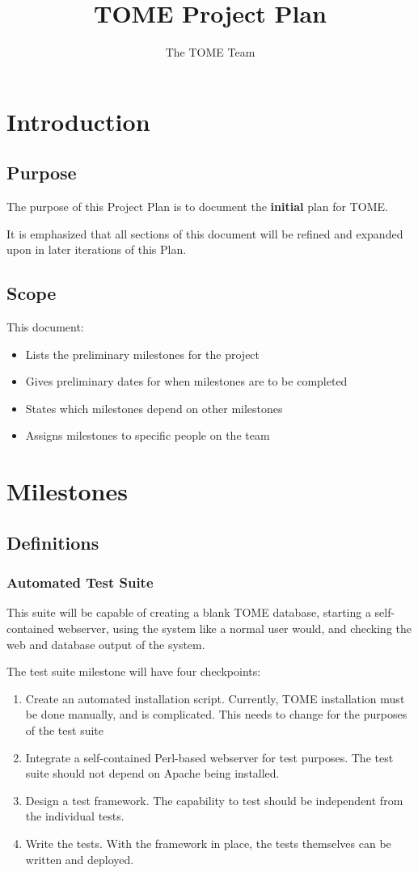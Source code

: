 \documentclass[12pt,titlepage]{article}
\author{The TOME Team}
\title{\textbf{TOME Project Plan}}
\begin{document}
\maketitle
\tableofcontents
\listoffigures
\newpage
\section{Introduction}
\subsection{Purpose}
The purpose of this Project Plan is to document the \textbf{initial} plan for TOME.

It is emphasized that all sections of this document will be refined and expanded upon in later iterations of this Plan.

\subsection{Scope}
This document:
\begin{itemize}
	\item Lists the preliminary milestones for the project
	\item Gives preliminary dates for when milestones are to be completed
	\item States which milestones depend on other milestones
        \item Assigns milestones to specific people on the team
\end{itemize}
\section{Milestones}
\subsection{Definitions}
\subsubsection{Automated Test Suite}
This suite will be capable of creating a blank TOME database, starting a self-contained webserver, using the system like a normal user would, and checking the web and database output of the system.

The test suite milestone will have four checkpoints:
\begin{enumerate}
	\item Create an automated installation script. Currently, TOME installation must be done manually, and is complicated. This needs to change for the purposes of the test suite
	\item Integrate a self-contained Perl-based webserver for test purposes. The test suite should not depend on Apache being installed.
	\item Design a test framework. The capability to test should be independent from the individual tests.
	\item Write the tests. With the framework in place, the tests themselves can be written and deployed.
\end{enumerate}
\end{document}
